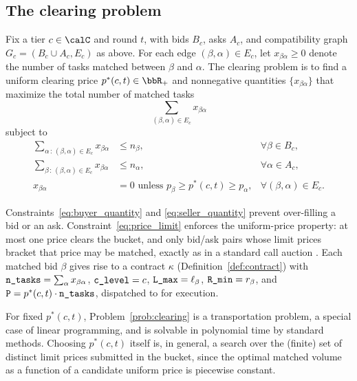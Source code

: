 \subsection{The clearing problem}
\label{sec:clearing_problem}

\begin{problem}
\label{prob:clearing}
Fix a tier $c \in \calC$ and round $t$, with bids $B_c$, asks $A_c$, and
compatibility graph $G_c = (B_c \cup A_c, E_c)$ as above. For each edge
$(\beta, \alpha) \in E_c$, let $x_{\beta \alpha} \geq 0$ denote the number
of tasks matched between $\beta$ and $\alpha$. The \NoesisMarket{}
clearing problem is to find a uniform clearing price
$p^*(c, t) \in \bbR_+$ and nonnegative quantities $\{x_{\beta \alpha}\}$
that maximize the total number of matched tasks
\begin{equation}
  \label{eq:clearing_objective}
  \sum_{(\beta, \alpha) \in E_c} x_{\beta \alpha}
\end{equation}
subject to
\begin{align}
  \label{eq:buyer_quantity}
  \sum_{\alpha \,:\, (\beta, \alpha) \in E_c} x_{\beta \alpha}
    &\leq n_\beta, & \forall \beta \in B_c, \\
  \label{eq:seller_quantity}
  \sum_{\beta \,:\, (\beta, \alpha) \in E_c} x_{\beta \alpha}
    &\leq n_\alpha, & \forall \alpha \in A_c, \\
  \label{eq:price_limit}
  x_{\beta \alpha} &= 0
    \text{ unless } p_\beta \geq p^*(c, t) \geq p_\alpha,
    & \forall (\beta, \alpha) \in E_c.
\end{align}
\end{problem}

Constraints~\eqref{eq:buyer_quantity} and \eqref{eq:seller_quantity}
prevent over-filling a bid or an ask. Constraint~\eqref{eq:price_limit}
enforces the uniform-price property: at most one price clears the bucket,
and only bid/ask pairs whose limit prices bracket that price may be
matched, exactly as in a standard call auction \cite{mcafee1992}. Each
matched bid $\beta$ gives rise to a contract $\kappa$
(Definition~\ref{def:contract}) with
$\textnormal{\texttt{n\_tasks}} = \sum_\alpha x_{\beta \alpha}$, $\textnormal{\texttt{c\_level}} = c$,
$\textnormal{\texttt{L\_max}} = \ell_\beta$, $\textnormal{\texttt{R\_min}} = r_\beta$, and
$\textnormal{\texttt{P}} = p^*(c, t) \cdot \textnormal{\texttt{n\_tasks}}$, dispatched to \NoesisServer{}
for execution.

For fixed $p^*(c, t)$, Problem~\ref{prob:clearing} is a transportation
problem, a special case of linear programming, and is solvable in
polynomial time by standard methods. Choosing $p^*(c, t)$ itself is, in
general, a search over the (finite) set of distinct limit prices submitted
in the bucket, since the optimal matched volume as a function of a
candidate uniform price is piecewise constant.

